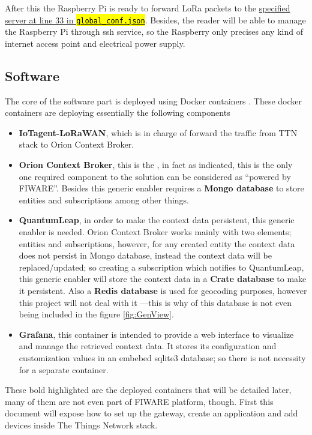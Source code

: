 \documentclass[11pt,a4paper,dvipsnames,twoside]{article}
\newcommand{\myuline}[1]{%
  \uline{\phantom{#1}}%
  \llap{\contour{white}{#1}}%
}
\newcommand{\cmd}[1] {\hl{\texttt{#1}}}
\begin{document}
After this the Raspberry Pi is ready to forward LoRa packets to the \href{https://github.com/dragino/dual_chan_pkt_fwd/blob/master/global_conf.json#L33}{specified server at line 33 in \cmd{global\_conf.json}}. Besides, the reader will be able to manage the Raspberry Pi through ssh service, so the Raspberry only precises any kind of internet access point and electrical power supply.

\subsection{Software}

The core of the software part is deployed using Docker containers \cite{Docker_container}. These docker containers are deploying essentially the following components

\begin{itemize}
  \item \textbf{IoTagent-LoRaWAN}, which is in charge of forward the traffic from TTN stack to Orion Context Broker.
  \item \textbf{Orion Context Broker}, this is the \myuline{core generic enabler}, in fact as indicated, this is the only one required component to the solution can be considered as \enquote{powered by FIWARE}. Besides this generic enabler requires a \textbf{Mongo database} to store entities and subscriptions among other things. 
  \item \textbf{QuantumLeap}, in order to make the context data persistent, this generic enabler is needed. Orion Context Broker works mainly with two elements; entities and subscriptions, however, for any created entity the context data does not persist in Mongo database, instead the context data will be replaced/updated; so creating a subscription which notifies to QuantumLeap, this generic enabler will store the context data in a \textbf{Crate database} to make it persistent. Also a \textbf{Redis database} is used for geocoding purposes, however this project will not deal with it ---this is why of this database is not even being included in the figure \ref{fig:GenView}.
  \item \textbf{Grafana}, this container is intended to provide a web interface to visualize and manage the retrieved context data. It stores its configuration and customization values in an embebed sqlite3 database; so there is not necessity for a separate container. 
\end{itemize}

These bold highlighted are the deployed containers that will be detailed later, many of them are not even part of FIWARE platform, though. First this document will expose how to set up the gateway, create an application and add devices inside The Things Network stack. 
\end{document}
